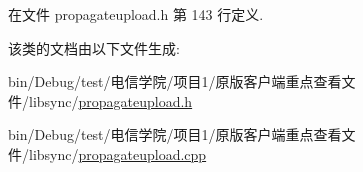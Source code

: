 在文件 propagateupload.\+h 第 143 行定义.



该类的文档由以下文件生成\+:\begin{DoxyCompactItemize}
\item 
bin/\+Debug/test/电信学院/项目1/原版客户端重点查看文件/libsync/\hyperlink{propagateupload_8h}{propagateupload.\+h}\item 
bin/\+Debug/test/电信学院/项目1/原版客户端重点查看文件/libsync/\hyperlink{propagateupload_8cpp}{propagateupload.\+cpp}\end{DoxyCompactItemize}
